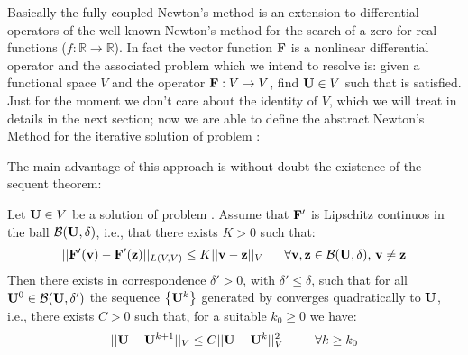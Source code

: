 Basically the fully coupled Newton's method is an extension to differential operators of the well known Newton's method for the search of a zero for real functions ($f:\mathbb{R}\rightarrow \mathbb{R}$). In fact the vector function $\mathbf{F}$ is a nonlinear differential operator and the associated problem which we intend to resolve is: given a functional space $V$ and the operator $\mathbf{F}:V\rightarrow V$, find $\mathbf{U}\in V$ such that  is satisfied.
Just for the moment we don't care about the identity of $V$, which we will treat in details in the next section; now we are able to define  the abstract Newton's Method for the iterative solution of problem :


\vspace{0.1cm}

The main advantage of this approach is without doubt the existence of the sequent theorem:

\begin{Teorema}
\label{theorem: newton convergence}
Let  $\mathbf{U}\in V$ be a solution of problem . Assume that $\mathbf{F'}$ is Lipschitz continuos in the ball $\mathcal{B}(\mathbf{U},\delta)$, i.e., that there exists  $K>0$ such that:
\begin{equation}
||\vect{F'}(\vect{v})-\vect{F'}(\vect{z})||_{L(V,V)} \leq K ||\vect{v}-\vect{z}||_V \psp{10} \forall \vect{v},\vect{z} \in \mathcal{B}(\vect{U},\delta), \, \vect{v}\neq \vect{z}
\end{equation}
Then there exists in correspondence $\delta '>0$, with $\delta '\leq\delta$, such that for all $\mathbf{U}^0 \in \mathcal{B}(\mathbf{U},\delta ')$ the sequence $\left\{ \mathbf{U}^k \right\}$ generated by  converges quadratically to $\mathbf{U}$, i.e., there exists $C>0$ such that, for a suitable $k_0\geq 0$ we have:
\begin{equation}
\label{eq: convergece newton}
||\vect{U}-\vect{U}^{k+1}||_V\leq C||\vect{U}-\vect{U}^k||_V^2 \psp{15} \forall k\geq k_0
\end{equation}
\end{Teorema}

